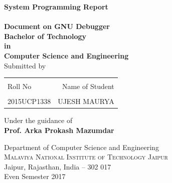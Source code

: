 \documentclass[12pt]{article}
\begin{document}
  
  

\begin{titlepage}

\begin{center}

\textup{\small {\bf System Programming Report} \\}\\[0.2in]

\Large \textbf {Document on GNU Debugger}\\[0.5in]

       

       {\bf Bachelor of Technology \\in\\ Computer Science and Engineering}\\[0.5in]

\normalsize Submitted by \\
\begin{table}[h]
\centering
\begin{tabular}{lr}\hline \\
Roll No & Name of Student  \\ \hline
\\
2015UCP1338 & UJESH MAURYA 
 \\ \hline 
\end{tabular}
\end{table}

\vspace{.1in}
Under the guidance of\\
{\textbf{Prof. Arka Prokash Mazumdar}}\\[0.2in]

\vfill


\Large{Department of Computer Science and Engineering}\\
\normalsize
\textsc{Malaviya National Institute of Technology Jaipur}\\
Jaipur, Rajasthan, India -- 302 017 \\
\vspace{0.2cm}
Even Semester 2017

\end{center}

\end{titlepage}
\end{document}
